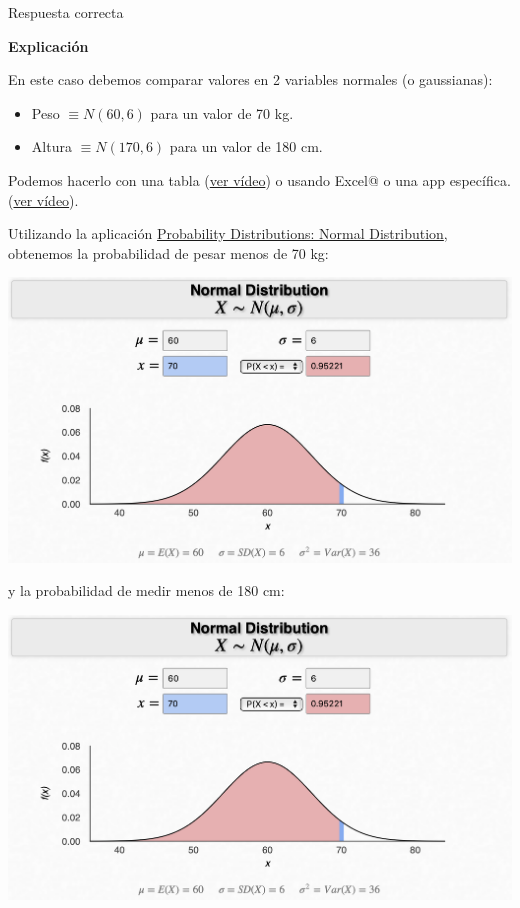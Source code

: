 \documentclass[
]{book}
\providecommand{\tightlist}{%
  \setlength{\itemsep}{0pt}\setlength{\parskip}{0pt}}
\begin{document}
Respuesta correcta

\textbf{Explicación}

En este caso debemos comparar valores en 2 variables normales (o gaussianas):

\begin{itemize}
\tightlist
\item
  Peso \(\equiv N(60, 6)\) para un valor de 70 kg.
\item
  Altura \(\equiv N(170, 6)\) para un valor de 180 cm.
\end{itemize}

Podemos hacerlo con una tabla (\href{https://youtu.be/xCBUdpIUx18}{ver vídeo}) o usando Excel@ o una app específica. (\href{https://youtu.be/rxkPlU1Ud7c}{ver vídeo}).

Utilizando la aplicación \href{https://homepage.divms.uiowa.edu/~mbognar/applets/normal.html}{Probability Distributions: Normal Distribution}, obtenemos la probabilidad de pesar menos de 70 kg:

\includegraphics[width=20.78in]{img/3_1}

y la probabilidad de medir menos de 180 cm:

\includegraphics[width=20.78in]{img/3_1}
\end{document}
